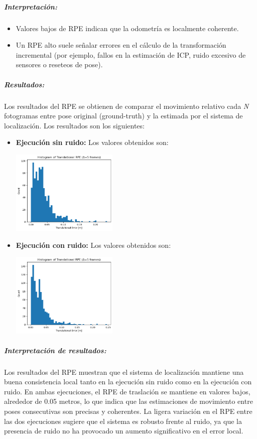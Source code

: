 \documentclass[12pt, a4paper, twoside]{article}
\begin{document}
\subparagraph{Interpretación:}
\begin{itemize}
  \item Valores bajos de RPE indican que la odometría es localmente coherente.
  \item Un RPE alto suele señalar errores en el cálculo de la transformación incremental 
  (por ejemplo, fallos en la estimación de ICP, ruido excesivo de sensores o reseteos de pose).
\end{itemize}

\subparagraph{Resultados:}
Los resultados del RPE se obtienen de comparar el movimiento relativo cada \textit{N} fotogramas entre pose original (ground-truth) y la estimada por el sistema de localización. 
Los resultados son los siguientes:
\begin{itemize}
  \item \textbf{Ejecución sin ruido:} Los valores obtenidos son: \newline

    \includegraphics[width=0.4\textwidth]{rpe_clean.png}

  \item \textbf{Ejecución con ruido:} Los valores obtenidos son: \newline

    \includegraphics[width=0.4\textwidth]{rpe_noisy.png}
\end{itemize}

\subparagraph{Interpretación de resultados:}
Los resultados del RPE muestran que el sistema de localización mantiene una buena consistencia local tanto en la ejecución sin ruido como en la ejecución con ruido.
En ambas ejecuciones, el RPE de traslación se mantiene en valores bajos, alrededor de 0.05 metros, lo que indica que las estimaciones de movimiento entre poses consecutivas
son precisas y coherentes.\newline
La ligera variación en el RPE entre las dos ejecuciones sugiere que el sistema es robusto frente al ruido, ya que la presencia de ruido no ha provocado un aumento significativo en
el error local.\newline
\end{document}
